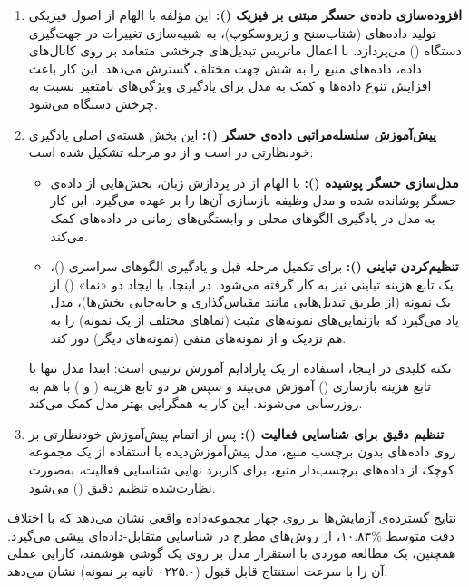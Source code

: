 \begin{enumerate}
\item \textbf{افزوده‌سازی داده‌ی حسگر مبتنی بر فیزیک ():} این مؤلفه با الهام از اصول فیزیکی تولید داده‌های  (شتاب‌سنج و ژیروسکوپ)، به شبیه‌سازی تغییرات در جهت‌گیری دستگاه () می‌پردازد. با اعمال ماتریس تبدیل‌های چرخشی متعامد بر روی کانال‌های داده، داده‌های منبع را به شش جهت مختلف گسترش می‌دهد. این کار باعث افزایش تنوع داده‌ها و کمک به مدل برای یادگیری ویژگی‌های نامتغیر نسبت به چرخش دستگاه می‌شود.
\item \textbf{پیش‌آموزش سلسله‌مراتبی داده‌ی حسگر ():} این بخش هسته‌ی اصلی یادگیری خودنظارتی در  است و از دو مرحله تشکیل شده است:
\begin{itemize}
    \item \textbf{مدل‌سازی حسگر پوشیده ():} با الهام از  در پردازش زبان، بخش‌هایی از داده‌ی حسگر پوشانده شده و مدل وظیفه بازسازی آن‌ها را بر عهده می‌گیرد. این کار به مدل در یادگیری الگوهای محلی و وابستگی‌های زمانی در داده‌های  کمک می‌کند.
    \item \textbf{تنظیم‌کردن تباینی ():} برای تکمیل مرحله قبل و یادگیری الگوهای سراسری ()، یک تابع هزینه تباینی نیز به کار گرفته می‌شود. در اینجا، با ایجاد دو «نما» () از یک نمونه (از طریق تبدیل‌هایی مانند مقیاس‌گذاری و جابه‌جایی بخش‌ها)، مدل یاد می‌گیرد که بازنمایی‌های نمونه‌های مثبت (نماهای مختلف از یک نمونه) را به هم نزدیک و از نمونه‌های منفی (نمونه‌های دیگر) دور کند.
\end{itemize}
نکته کلیدی در اینجا، استفاده از یک پارادایم آموزش ترتیبی است: ابتدا مدل تنها با تابع هزینه بازسازی () آموزش می‌بیند و سپس هر دو تابع هزینه ( و ) با هم به روزرسانی می‌شوند. این کار به همگرایی بهتر مدل کمک می‌کند.
\item \textbf{تنظیم دقیق برای شناسایی فعالیت ():} پس از اتمام پیش‌آموزش خودنظارتی بر روی داده‌های بدون برچسب منبع، مدل پیش‌آموزش‌دیده با استفاده از یک مجموعه کوچک از داده‌های برچسب‌دار منبع، برای کاربرد نهایی شناسایی فعالیت، به‌صورت نظارت‌شده تنظیم دقیق () می‌شود.
\end{enumerate}

نتایج گسترده‌ی آزمایش‌ها بر روی چهار مجموعه‌داده واقعی نشان می‌دهد که  با اختلاف دقت متوسط \%۱۰.۸۳، از روش‌های مطرح در شناسایی متقابل-داده‌ای پیشی می‌گیرد. همچنین، یک مطالعه موردی با استقرار مدل بر روی یک گوشی هوشمند، کارایی عملی آن را با سرعت استنتاج قابل قبول (۰۲۲۵.۰ ثانیه بر نمونه) نشان می‌دهد.

